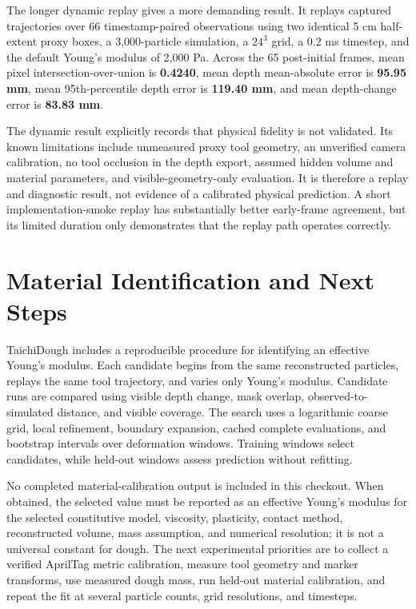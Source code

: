 \documentclass[10pt,a4paper]{article}
\begin{document}
The longer dynamic replay gives a more demanding result. It replays captured trajectories over 66 timestamp-paired observations using two identical 5 cm half-extent proxy boxes, a 3,000-particle simulation, a $24^3$ grid, a 0.2 ms timestep, and the default Young's modulus of 2,000 Pa. Across the 65 post-initial frames, mean pixel intersection-over-union is \textbf{0.4240}, mean depth mean-absolute error is \textbf{95.95 mm}, mean 95th-percentile depth error is \textbf{119.40 mm}, and mean depth-change error is \textbf{83.83 mm}.

The dynamic result explicitly records that physical fidelity is not validated. Its known limitations include unmeasured proxy tool geometry, an unverified camera calibration, no tool occlusion in the depth export, assumed hidden volume and material parameters, and visible-geometry-only evaluation. It is therefore a replay and diagnostic result, not evidence of a calibrated physical prediction. A short implementation-smoke replay has substantially better early-frame agreement, but its limited duration only demonstrates that the replay path operates correctly.

\section{Material Identification and Next Steps}

TaichiDough includes a reproducible procedure for identifying an effective Young's modulus. Each candidate begins from the same reconstructed particles, replays the same tool trajectory, and varies only Young's modulus. Candidate runs are compared using visible depth change, mask overlap, observed-to-simulated distance, and visible coverage. The search uses a logarithmic coarse grid, local refinement, boundary expansion, cached complete evaluations, and bootstrap intervals over deformation windows. Training windows select candidates, while held-out windows assess prediction without refitting.

No completed material-calibration output is included in this checkout. When obtained, the selected value must be reported as an effective Young's modulus for the selected constitutive model, viscosity, plasticity, contact method, reconstructed volume, mass assumption, and numerical resolution; it is not a universal constant for dough. The next experimental priorities are to collect a verified AprilTag metric calibration, measure tool geometry and marker transforms, use measured dough mass, run held-out material calibration, and repeat the fit at several particle counts, grid resolutions, and timesteps.
\end{document}
